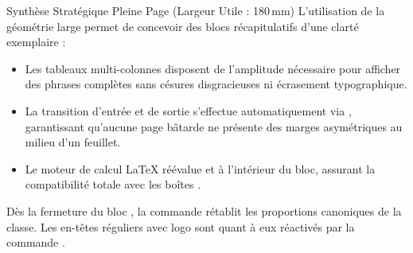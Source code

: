 \begin{WideGeometry}
\begin{boiteSynthese}{Synthèse Stratégique Pleine Page (Largeur Utile : 180\,mm)}
L'utilisation de la géométrie large permet de concevoir des blocs récapitulatifs d'une clarté exemplaire :
\begin{itemize}
  \item Les tableaux multi-colonnes disposent de l'amplitude nécessaire pour afficher des phrases complètes
  sans césures disgracieuses ni écrasement typographique.
  \item La transition d'entrée et de sortie s'effectue automatiquement via ,
  garantissant qu'aucune page bâtarde ne présente des marges asymétriques au milieu d'un feuillet.
  \item Le moteur de calcul \LaTeX{} réévalue  et 
  à l'intérieur du bloc, assurant la compatibilité totale avec les boîtes .
\end{itemize}
\end{boiteSynthese}

\end{WideGeometry}
\activerStyleStandard

Dès la fermeture du bloc ,
la commande  rétablit les proportions canoniques de la classe.
Les en-têtes réguliers avec logo sont quant à eux réactivés par la commande
.

